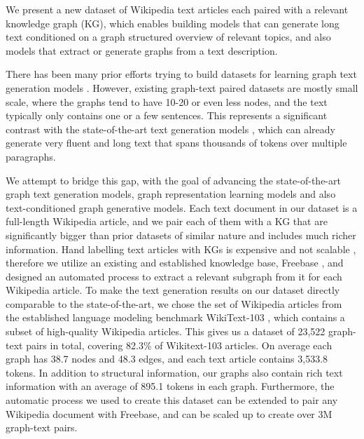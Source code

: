 \documentclass[11pt]{article}
\begin{document}
We present a new dataset of Wikipedia text articles each paired with a relevant knowledge graph (KG),
which enables building models that can generate long text conditioned on a graph structured overview of relevant topics,  and also models that extract or generate graphs from a text description.


There has been many prior efforts trying to build datasets for learning graph  text generation models \cite{jin-etal-2020-genwiki, gardent-etal-2017-webnlg, lebret-etal-2016-neural}.
However, existing graph-text paired datasets are mostly small scale, where the graphs tend to have 10-20 or even less nodes, and the text typically only contains one or a few sentences.  This represents a significant contrast with the state-of-the-art text generation models \cite{dai2019transformer,brown2020language}, which can already generate very fluent and long text that spans thousands of tokens over multiple paragraphs.

We attempt to bridge this gap, with the goal of advancing the state-of-the-art graph  text generation models, graph representation learning models and also text-conditioned graph generative models.  Each text document in our dataset is a full-length Wikipedia article, and we pair each of them with a KG that are significantly bigger than prior datasets of similar nature and includes much richer information.  Hand labelling text articles with KGs is expensive and not scalable \cite{jin-etal-2020-genwiki},
therefore we utilize an existing and established knowledge base, Freebase \cite{bollacker2008freebase}, and designed an automated process to extract a relevant subgraph from it for each Wikipedia article. To make the text generation results on our dataset directly comparable to the state-of-the-art, we chose the set of Wikipedia articles from the established language modeling
benchmark WikiText-103 \cite{merity2016pointer}, which contains a subset of high-quality Wikipedia articles.  This gives us a dataset of 23,522 graph-text pairs in total, covering 82.3\% of Wikitext-103 articles. On average each graph has 38.7 nodes and 48.3 edges, and each text article contains 3,533.8 tokens.
In addition to structural information, our graphs also contain rich text information with an average of 895.1 tokens in each graph.  Furthermore, the automatic process we used to create this dataset can be extended to pair any Wikipedia document with Freebase, and can be scaled up to create over 3M graph-text pairs.
\end{document}
